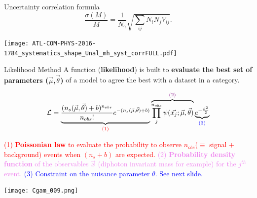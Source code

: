 \begin{frame}{Uncertainty correlation formula}
\centering
\begin{equation}
  \frac{\sigma(M)}{M} = \frac{1}{N_\gamma}\sqrt{\sum_{ij}N_iN_jV_{ij}}.
  \label{eq:HGam_covariance}
\end{equation}

\texttt{[image: ATL-COM-PHYS-2016-1784\_systematics\_shape\_Unal\_mh\_syst\_corrFULL.pdf]}\\


\end{frame}

\begin{frame}{Likelihood Method}
A function ({\bf likelihood}) is built to {\bf evaluate the best set of parameters ($\vec{\mu}$,$\vec{\theta}$)} of a model to agree the best with a dataset in a category.

$$\mathcal{L}=\underbrace{\frac{(n_{s}(\vec{\mu},\vec{\theta})+b)^{n_{obs}}}{n_{obs}!} e^{-(n_{s}(\vec{\mu},\vec{\theta})+b)}}_{\textcolor{red}{\text{(1)}}}  \overbrace{\prod_j^{n_{obs}}\psi(\vec{x_j};\vec{\mu},\vec{\theta})}^{\textcolor{violet}{\text{(2)}}} \underbrace{e^{-\frac{\theta^2}{2}}}_{\textcolor{blue}{\text{(3)}}}$$
\vfill
\begin{minipage}{0.49\linewidth}
\textcolor{red}{(1) {\bf Poissonian law} to evaluate the probability to observe $n_{obs}$($\equiv$ signal $+$ background) events when $(n_s+b)$ are expected.}\newline
\textcolor{violet}{(2) {\bf Probability density function} of the observables $\vec{x}$ (diphoton invariant mass for example) for the $j^{th}$ event.}\newline
\textcolor{blue}{(3) Constraint on the nuisance parameter $\theta$. See next slide.}\newline
\end{minipage}
\begin{minipage}{0.49\linewidth}
\texttt{[image: Cgam\_009.png]}
\end{minipage}
\end{frame}

